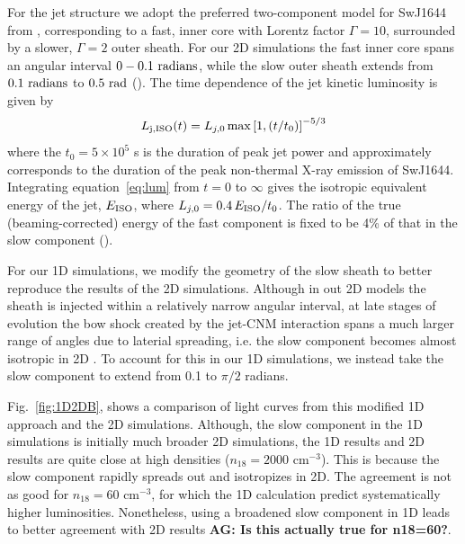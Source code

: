 \documentclass[usenatbib,fleqn]{mnras}
\begin{document}
For the jet structure we adopt the preferred two-component model for
SwJ1644 from \citet{Mimica+2015}, corresponding to a fast, inner core
with Lorentz factor $\Gamma = 10$, surrounded by a slower, $\Gamma=2$
outer sheath.  For our 2D simulations the fast inner core spans an
angular interval $0-0.1\ {\rm radians}$, while the slow outer sheath
extends from $0.1\ {\rm radians}$ to $0.5\ {\rm rad}$
(\citealt{Mimica+2015}).  The time dependence of the jet kinetic
luminosity is given by
\begin{equation}\label{eq:lum}
L_{\rm j, ISO}(t) = L_{j,0}\max\left[1, (t/t_0)\right]^{-5/3}
\end{equation}
%
where the $t_0 = 5\times 10^5$ s is the duration of peak jet power and
approximately corresponds to the duration of the peak non-thermal
X-ray emission of SwJ1644.  Integrating equation~\ref{eq:lum} from $t
= 0$ to $\infty$ gives the isotropic equivalent energy of the jet,
$E_{\rm ISO}$, where $L_{j,0}=0.4\, E_{\rm ISO}/t_0$.  The ratio of
the true (beaming-corrected) energy of the fast component is fixed to
be 4\% of that in the slow component (\citealt{Mimica+2015}).

For our 1D simulations, we modify the geometry of the slow sheath to
better reproduce the results of the 2D simulations.  Although in out
2D models the sheath is injected within a relatively narrow angular
interval, at late stages of evolution the bow shock created by the
jet-CNM interaction spans a much larger range of angles due to
laterial spreading, i.e. the slow component becomes almost isotropic
in 2D \citep[bottom two panels of Fig.~8 in][]{Mimica+2015}. To
account for this in our 1D simulations, we instead take the slow
component to extend from 0.1 to $\pi/2$ radians.

Fig.~\ref{fig:1D2DB}, shows a comparison of light curves from this
modified 1D approach and the 2D simulations. Although, the slow
component in the 1D simulations is initially much broader 2D
simulations, the 1D results and 2D results are quite close at high
densities ($n_{18}=2000$ cm$^{-3}$). This is because the slow
component rapidly spreads out and isotropizes in 2D. The agreement is
not as good for $n_{18}=60$ cm$^{-3}$, for which the 1D calculation predict
systematically higher luminosities. Nonetheless, using a broadened
slow component in 1D leads to better agreement with 2D results {\bf
  AG: Is this actually true for n18=60?}.

\end{document}
